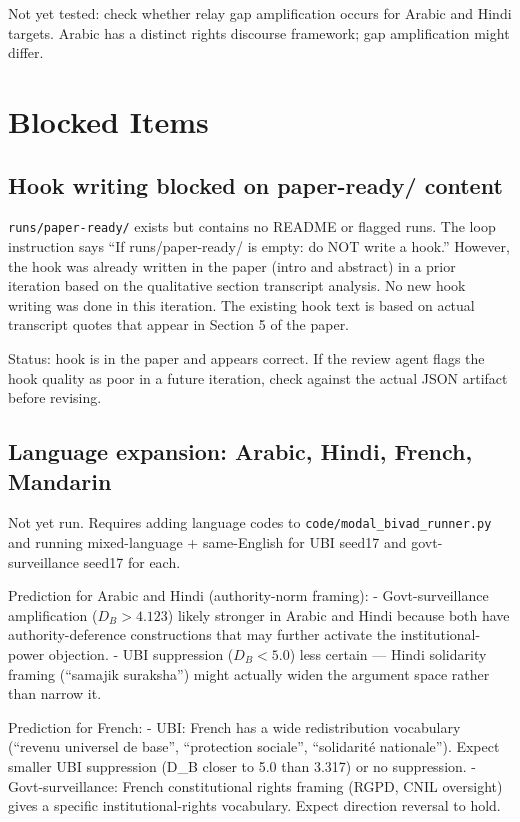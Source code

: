 Not yet tested: check whether relay gap amplification occurs for Arabic and Hindi targets.
Arabic has a distinct rights discourse framework; gap amplification might differ.

\section*{Blocked Items}

\subsection*{Hook writing blocked on paper-ready/ content}

\texttt{runs/paper-ready/} exists but contains no README or flagged runs. The loop instruction
says ``If runs/paper-ready/ is empty: do NOT write a hook.'' However, the hook was already
written in the paper (intro and abstract) in a prior iteration based on the qualitative
section transcript analysis. No new hook writing was done in this iteration. The existing
hook text is based on actual transcript quotes that appear in Section 5 of the paper.

Status: hook is in the paper and appears correct. If the review agent flags the hook quality
as poor in a future iteration, check against the actual JSON artifact before revising.

\subsection*{Language expansion: Arabic, Hindi, French, Mandarin}

Not yet run. Requires adding language codes to \texttt{code/modal\_bivad\_runner.py} and
running mixed-language + same-English for UBI seed17 and govt-surveillance seed17 for each.

Prediction for Arabic and Hindi (authority-norm framing):
- Govt-surveillance amplification ($D_B > 4.123$) likely stronger in Arabic and Hindi
  because both have authority-deference constructions that may further activate the
  institutional-power objection.
- UBI suppression ($D_B < 5.0$) less certain — Hindi solidarity framing (``samajik
  suraksha'') might actually widen the argument space rather than narrow it.

Prediction for French:
- UBI: French has a wide redistribution vocabulary (``revenu universel de base'',
  ``protection sociale'', ``solidarité nationale''). Expect smaller UBI suppression
  (D_B closer to 5.0 than 3.317) or no suppression.
- Govt-surveillance: French constitutional rights framing (RGPD, CNIL oversight) gives
  a specific institutional-rights vocabulary. Expect direction reversal to hold.

